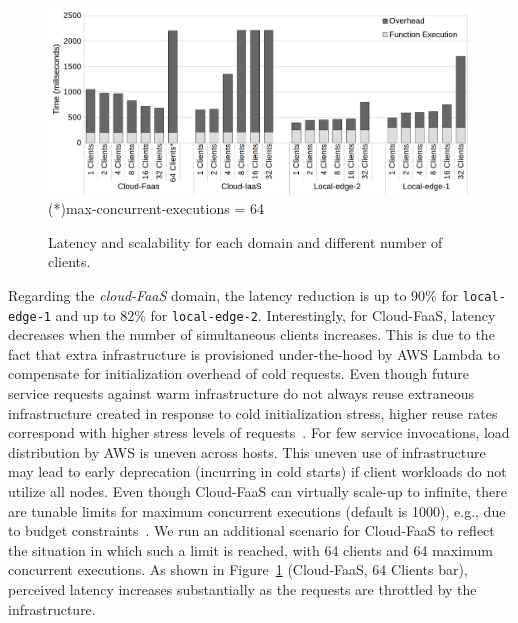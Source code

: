 \begin{figure}
	
	\centering
	\includegraphics[width=.9\textwidth]{figs/latency-domain-new}
	\scriptsize{(*)max-concurrent-executions = 64}
	\vspace{-.3cm}
	\caption{Latency and scalability for each domain and different number of clients.}
	\label{fig:latency-domains}
\end{figure}

 Regarding the \textit{cloud-FaaS} domain, the latency reduction is up to $90$\% for \texttt{local-edge-1} and up to $82$\% for \texttt{local-edge-2}. Interestingly, for Cloud-FaaS, latency decreases when the number of simultaneous clients increases.
 This is due to the fact that extra infrastructure is provisioned under-the-hood by AWS Lambda to compensate for initialization overhead of cold requests. Even though future service requests against warm infrastructure do not always reuse extraneous infrastructure created in response to cold initialization stress, higher reuse rates correspond with higher stress levels of requests~\cite{Lloyd18serverless}. For few service invocations, load distribution by AWS is uneven across hosts. This uneven use of infrastructure may lead to early deprecation (incurring in cold starts) if client workloads do not utilize all nodes. 
 Even though Cloud-FaaS can virtually scale-up to infinite, there are tunable limits for maximum concurrent executions (default is 1000), e.g., due to budget constraints~\cite{Villamizar2017lambda}. We run an additional scenario for Cloud-FaaS to reflect the situation in which such a limit is reached, with 64 clients and 64 maximum concurrent executions. As shown in Figure~\ref{fig:latency-domains} (Cloud-FaaS, 64 Clients bar), perceived latency increases substantially as the requests are throttled by the infrastructure.
 
